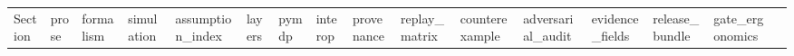 \documentclass[
  english,
]{article}
\begin{document}
{\begin{longtable}[]
{  >{\raggedright\arraybackslash}p{}
  >{\raggedright\arraybackslash}p{}
  >{\raggedright\arraybackslash}p{}@{}}
\toprule\noalign{}
\begin{minipage}[b]{\linewidth}\raggedright
Section
\end{minipage} & \begin{minipage}[b]{\linewidth}\raggedright
prose
\end{minipage} & \begin{minipage}[b]{\linewidth}\raggedright
formalism
\end{minipage} & \begin{minipage}[b]{\linewidth}\raggedright
simulation
\end{minipage} & \begin{minipage}[b]{\linewidth}\raggedright
assumption\_index
\end{minipage} & \begin{minipage}[b]{\linewidth}\raggedright
layers
\end{minipage} & \begin{minipage}[b]{\linewidth}\raggedright
pymdp
\end{minipage} & \begin{minipage}[b]{\linewidth}\raggedright
interop
\end{minipage} & \begin{minipage}[b]{\linewidth}\raggedright
provenance
\end{minipage} & \begin{minipage}[b]{\linewidth}\raggedright
replay\_matrix
\end{minipage} & \begin{minipage}[b]{\linewidth}\raggedright
counterexample
\end{minipage} & \begin{minipage}[b]{\linewidth}\raggedright
adversarial\_audit
\end{minipage} & \begin{minipage}[b]{\linewidth}\raggedright
evidence\_fields
\end{minipage} & \begin{minipage}[b]{\linewidth}\raggedright
release\_bundle
\end{minipage} & \begin{minipage}[b]{\linewidth}\raggedright
gate\_ergonomics
\end{minipage} & \begin{minipage}[b]{\linewidth}\raggedright

\end{minipage}
\end{longtable}}
\end{document}
